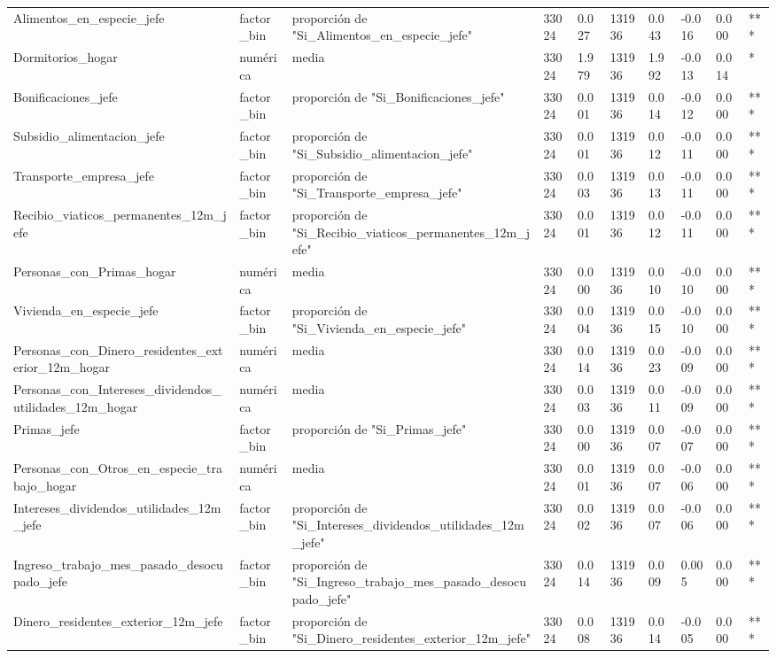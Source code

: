 \begin{longtable}[t]{llllllllll}
Alimentos\_en\_especie\_jefe & factor\_bin & proporción de "Si\_Alimentos\_en\_especie\_jefe" & 33024 & 0.027 & 131936 & 0.043 & -0.016 & 0.000 & ***\\
Dormitorios\_hogar & numérica & media & 33024 & 1.979 & 131936 & 1.992 & -0.013 & 0.014 & *\\
Bonificaciones\_jefe & factor\_bin & proporción de "Si\_Bonificaciones\_jefe" & 33024 & 0.001 & 131936 & 0.014 & -0.012 & 0.000 & ***\\
Subsidio\_alimentacion\_jefe & factor\_bin & proporción de "Si\_Subsidio\_alimentacion\_jefe" & 33024 & 0.001 & 131936 & 0.012 & -0.011 & 0.000 & ***\\
Transporte\_empresa\_jefe & factor\_bin & proporción de "Si\_Transporte\_empresa\_jefe" & 33024 & 0.003 & 131936 & 0.013 & -0.011 & 0.000 & ***\\
Recibio\_viaticos\_permanentes\_12m\_jefe & factor\_bin & proporción de "Si\_Recibio\_viaticos\_permanentes\_12m\_jefe" & 33024 & 0.001 & 131936 & 0.012 & -0.011 & 0.000 & ***\\
Personas\_con\_Primas\_hogar & numérica & media & 33024 & 0.000 & 131936 & 0.010 & -0.010 & 0.000 & ***\\
Vivienda\_en\_especie\_jefe & factor\_bin & proporción de "Si\_Vivienda\_en\_especie\_jefe" & 33024 & 0.004 & 131936 & 0.015 & -0.010 & 0.000 & ***\\
Personas\_con\_Dinero\_residentes\_exterior\_12m\_hogar & numérica & media & 33024 & 0.014 & 131936 & 0.023 & -0.009 & 0.000 & ***\\
Personas\_con\_Intereses\_dividendos\_utilidades\_12m\_hogar & numérica & media & 33024 & 0.003 & 131936 & 0.011 & -0.009 & 0.000 & ***\\
Primas\_jefe & factor\_bin & proporción de "Si\_Primas\_jefe" & 33024 & 0.000 & 131936 & 0.007 & -0.007 & 0.000 & ***\\
Personas\_con\_Otros\_en\_especie\_trabajo\_hogar & numérica & media & 33024 & 0.001 & 131936 & 0.007 & -0.006 & 0.000 & ***\\
Intereses\_dividendos\_utilidades\_12m\_jefe & factor\_bin & proporción de "Si\_Intereses\_dividendos\_utilidades\_12m\_jefe" & 33024 & 0.002 & 131936 & 0.007 & -0.006 & 0.000 & ***\\
Ingreso\_trabajo\_mes\_pasado\_desocupado\_jefe & factor\_bin & proporción de "Si\_Ingreso\_trabajo\_mes\_pasado\_desocupado\_jefe" & 33024 & 0.014 & 131936 & 0.009 & 0.005 & 0.000 & ***\\
Dinero\_residentes\_exterior\_12m\_jefe & factor\_bin & proporción de "Si\_Dinero\_residentes\_exterior\_12m\_jefe" & 33024 & 0.008 & 131936 & 0.014 & -0.005 & 0.000 & ***\\

\end{longtable}
